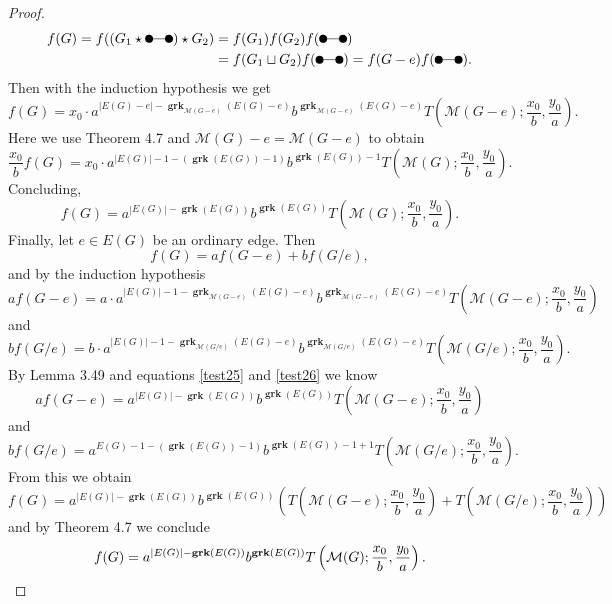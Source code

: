 \documentclass[12pt,a4paper, twoside, autooneside=false]{scrartcl}
\theoremstyle{definition}
\theoremstyle{remark}
\numberwithin{equation}{section}
\newcommand{\M}{\mathcal{M}} %
\DeclareMathOperator{\grk}{\mathbf{grk}} %
\begin{document}
\begin{proof}
\begin{align*}
f(G) = f((G_1 \star \begin{tikzpicture}
	[knoten/.style={circle, draw=black!100, fill=black!100, thick, 
				inner sep=0pt, minimum size=1.75mm}]
\node at (0,0)[knoten](1){};
\node at (0.5,0)[knoten] (2){}; 
\draw (1) -- (2);
\end{tikzpicture})  \star G_2) &= f(G_1) f(G_2) f(\begin{tikzpicture}
	[knoten/.style={circle, draw=black!100, fill=black!100, thick, 
				inner sep=0pt, minimum size=1.75mm}]
\node at (0,0)[knoten](1){};
\node at (0.5,0)[knoten] (2){}; 
\draw (1) -- (2);
\end{tikzpicture})\\ &= f(G_1 \sqcup G_2) f(\begin{tikzpicture}
	[knoten/.style={circle, draw=black!100, fill=black!100, thick, 
				inner sep=0pt, minimum size=1.75mm}]
\node at (0,0)[knoten](1){};
\node at (0.5,0)[knoten] (2){}; 
\draw (1) -- (2);
\end{tikzpicture}) = f(G - e) f( \begin{tikzpicture}
	[knoten/.style={circle, draw=black!100, fill=black!100, thick, 
				inner sep=0pt, minimum size=1.75mm}]
\node at (0,0)[knoten](1){};
\node at (0.5,0)[knoten] (2){}; 
\draw (1) -- (2);
\end{tikzpicture}).
\end{align*}
Then with the induction hypothesis we get
\[
f(G) = x_0 \cdot a^{|E(G) - e| - \grk_{\M(G - e)}(E(G) - e)}b^{\grk_{\M(G-e)}(E(G)-e)}T\left(\M(G - e); \frac{x_0}{b}, \frac{y_0}{a}\right).
\]
Here we use Theorem 4.7 and $\M(G)- e = \M(G - e)$ to obtain
\[
\frac{x_0}{b} f(G) = x_0 \cdot a^{|E(G)|- 1 - (\grk(E(G)) -1)}b^{\grk(E(G)) - 1}T\left(\M(G); \frac{x_0}{b}, \frac{y_0}{a}\right).
\]
Concluding,
\[
f(G) = a^{|E(G)| - \grk(E(G))}b^{\grk(E(G))}T\left(\M(G); \frac{x_0}{b}, \frac{y_0}{a}\right).
\]
Finally, let $e \in E(G)$ be an ordinary edge. Then 
\[
f(G) = a f(G - e) + b f(G / e),
\]
and by the induction hypothesis 
\begin{equation}\label{test25}
a f(G - e) = a \cdot a^{|E(G)| - 1 - \grk_{\M(G - e)}(E(G) - e)}b^{\grk_{\M(G - e)}(E(G) - e)}T\left(\M(G - e); \frac{x_0}{b}, \frac{y_0}{a}\right)
\end{equation}
and
\begin{equation}\label{test26}
b f(G / e) = b \cdot a^{|E(G)| - 1 - \grk_{\M(G/ e)}(E(G) - e)}b^{\grk_{\M(G / e)}(E(G) - e)} T\left(\M(G / e); \frac{x_0}{b}, \frac{y_0}{a}\right).
\end{equation}
By Lemma 3.49 and equations \eqref{test25} and \eqref{test26} we know
\[
a f(G - e) = a^{|E(G)| - \grk(E(G))}b^{\grk(E(G))}T\left(\M(G - e); \frac{x_0}{b}, \frac{y_0}{a}\right)
\]
and
\[
b f(G / e) = a^{E(G)- 1 - (\grk(E(G)) - 1)}b^{\grk(E(G)) - 1 + 1} T\left(\M(G/e); \frac{x_0}{b}, \frac{y_0}{a}\right).
\]
From this we obtain 
\[
f(G) = a^{|E(G)| - \grk(E(G))}b^{\grk(E(G))}\left(T\left(\M(G - e); \frac{x_0}{b}, \frac{y_0}{a}\right) + T\left(\M(G / e); \frac{x_0}{b}, \frac{y_0}{a}\right)\right)
\]
and by Theorem 4.7 we conclude 
\[
f(G) = a^{|E(G)| - \grk(E(G))}b^{\grk(E(G))} T\left(\M(G); \frac{x_0}{b}, \frac{y_0}{a}\right). \qedhere
\]
\end{proof}
\end{document}

